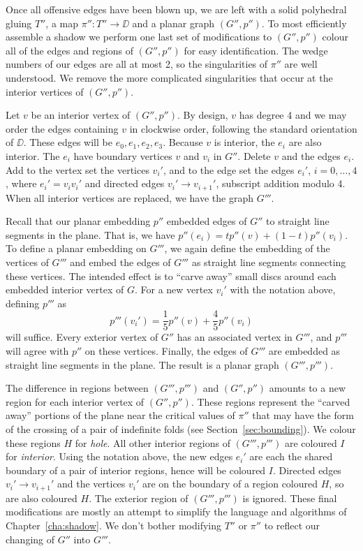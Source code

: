 \label{alg:finalmod}
Once all offensive edges have been blown up, we are left with a solid polyhedral gluing $T''$, a map $\pi'':T''\to \DD$ and a planar graph $(G'',p'')$.
To most efficiently assemble a shadow we perform one last set of modifications to $(G'',p'')$ colour all of the edges and regions of $(G'',p'')$ for easy identification.
The wedge numbers of our edges are all at most 2, so the singularities of $\pi''$ are well understood.
We remove the more complicated singularities that occur at the interior vertices of $(G'',p'')$.

Let $v$ be an interior vertex of $(G'',p'')$.
By design, $v$ has degree 4 and we may order the edges containing $v$ in clockwise order, following the standard orientation of $\DD$.
These edges will be $e_0,e_1,e_2,e_3$.
Because $v$ is interior, the $e_i$ are also interior.
The $e_i$ have boundary vertices $v$ and $v_i$ in $G''$.
Delete $v$ and the edges $e_i$.
Add to the vertex set the vertices $v_i'$, and to the edge set the edges $e_i'$, $i=0,\dots,4$, where $e_i'=v_i v_i'$ and directed edges $v_{i}'\to v_{i+1}'$, subscript addition modulo 4.
When all interior vertices are replaced, we have the graph $G'''$.

Recall that our planar embedding $p''$ embedded edges of $G''$ to straight line segments in the plane.
That is, we have $p''(e_i)=tp''(v)+(1-t)p''(v_i)$.
To define a planar embedding on $G'''$, we again define the embedding of the vertices of $G'''$ and embed the edges of $G'''$ as straight line segments connecting these vertices.
The intended effect is to ``carve away'' small discs around each embedded interior vertex of $G$.
For a new vertex $v_i'$ with the notation above, defining $p'''$ as
\[
  p'''(v_i')=\frac{1}{5}p''(v) + \frac{4}{5}p''(v_i)
\]
will suffice.
Every exterior vertex of $G''$ has an associated vertex in $G'''$, and $p'''$ will agree with $p''$ on these vertices.
Finally, the edges of $G'''$ are embedded as straight line segments in the plane.
The result is a planar graph $(G''',p''')$.

The difference in regions between $(G''',p''')$  and $(G'',p'')$ amounts to a new region for each interior vertex of $(G'',p'')$.
These regions represent the ``carved away'' portions of the plane near the critical values of $\pi''$ that may have the form of the crossing of a pair of indefinite folds (see Section~\ref{sec:bounding}).
We colour these regions $H$ for \emph{hole}.
All other interior regions of $(G''',p''')$ are coloured $I$ for \emph{interior}.
Using the notation above, the new edges $e_i'$ are each the shared boundary of a pair of interior regions, hence will be coloured $I$.
Directed edges $v_{i}'\to v_{i+1}'$ and the vertices $v_i'$ are on the boundary of a region coloured $H$, so are also coloured $H$.
The exterior region of $(G''',p''')$ is ignored.
These final modifications are mostly an attempt to simplify the language and algorithms of Chapter~\ref{cha:shadow}.
We don't bother modifying $T''$ or $\pi''$ to reflect our changing of $G''$ into $G'''$.

